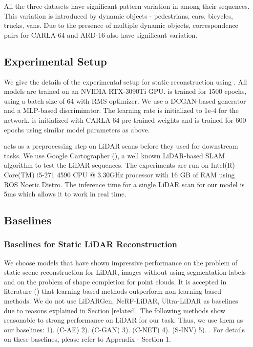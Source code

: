  All the three datasets have significant pattern variation in among their sequences. This variation is introduced by dynamic objects - pedestrians, cars, bicycles, trucks, vans. Due to the presence of multiple dynamic objects, correspondence pairs for CARLA-64 and ARD-16 also have significant variation.


\subsection{Experimental Setup}

We give the details of the experimental setup for static reconstruction using \dslr{}. All models are trained on an NVIDIA RTX-3090Ti GPU. \dslr{} is trained for 1500 epochs, using a batch size of 64 with RMS optimizer. We use a DCGAN-based generator and a MLP-based discriminator. The learning rate is initialized to 1e-4 for the network. \dslruda{} is initialized with CARLA-64 pre-trained weights and is trained for 600 epochs using similar model parameters as above. 


\dslr{} acts as a preprocessing step on LiDAR scans before they used for downstream tasks. We use Google Cartographer (\citet{hess2016real}), a well known LiDAR-based SLAM algorithm to test the LiDAR sequences. The experiments are run on Intel(R) Core(TM) i5-271
4590 CPU @ 3.30GHz processor with 16 GB of RAM using ROS Noetic Distro.  The inference time for a single LiDAR scan for our model is 5ms which allows it to work in real time. 


\subsection{Baselines}

\subsubsection{Baselines for Static LiDAR Reconstruction }
\label{baseline-recon}

We choose models that have shown impressive performance on the problem of static scene reconstruction for LiDAR, images without using segmentation labels and on the problem of shape completion for point clouds. It is accepted in literature (\citet{bescos2019empty}) that learning based methods outperform non-learning based methods. We do not use LiDARGen, NeRF-LiDAR, Ultra-LiDAR as baselines due to reasons explained in Section \ref{related}.
The following methods show reasonable to strong performance on LiDAR for our task. Thus, we use them as our baselines: 
1). \CacciaAE{} (C-AE) 2). \CacciaGAN{} (C-GAN) \cite {caccia2018deep} 3). \Coarse{}  (C-NET) \cite{wang2022coarse} 4). \siv{} (S-INV) \cite{zhang2021unsupervised} 5). \ds{} \cite{kumar2021dynamic}. For details on these baselines, please refer to Appendix - Section 1.


